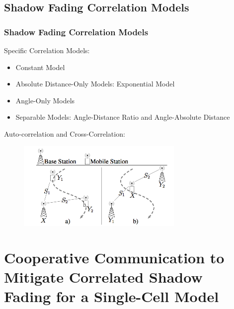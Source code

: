\documentclass{beamer}
\begin{document}
\subsection{Shadow Fading Correlation Models}
\begin{frame}
\frametitle{Shadow Fading Correlation Models}
Specific Correlation Models:
\begin{itemize}
\item Constant Model
\item Absolute Distance-Only Models: Exponential Model
\item Angle-Only Models
\item Separable Models: Angle-Distance Ratio and Angle-Absolute Distance
\end{itemize}
Auto-correlation and Cross-Correlation:
\begin{figure}
\includegraphics[width=8cm]{AutoandCross.png}
\end{figure}
\end{frame}
%

\section{Cooperative Communication to Mitigate Correlated Shadow Fading for a Single-Cell Model}
\end{document}
